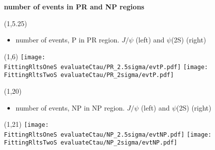 \documentclass[11pt,slidescentered,red,compress,handout,hyperref={bookmarks=true},mathseriftable]{beamer}
\newcommand{\FittingRltsOneS}{../Psi1S/Fit/parameter/}
\newcommand{\FittingRltsTwoS}{../Psi2S/Fit/parameter/}
\begin{document}
\section{}
\begin{frame}[t]{\small \bf number of events in PR and NP regions}{}
\begin{textblock}{48}(1,5.25)
\begin{itemize}
\scriptsize \item  number of events, P in PR region. $J/\psi$ (left) and $\psi$(2S) (right)
\end{itemize}
\end{textblock}
\begin{textblock}{48}(1,6)
\hspace*{10pt} \texttt{[image: \\FittingRltsOneS evaluateCtau/PR\_2.5sigma/evtP.pdf]}
\hspace*{10pt} \texttt{[image: \\FittingRltsTwoS evaluateCtau/PR\_2sigma/evtP.pdf]}
\end{textblock}

\begin{textblock}{48}(1,20)
\begin{itemize}
\scriptsize \item  number of events, NP in NP region. $J/\psi$ (left) and $\psi$(2S) (right)
\end{itemize}
\end{textblock}
\begin{textblock}{48}(1,21)
\hspace*{10pt} \texttt{[image: \\FittingRltsOneS evaluateCtau/NP\_2.5sigma/evtNP.pdf]}
\hspace*{10pt} \texttt{[image: \\FittingRltsTwoS evaluateCtau/NP\_2sigma/evtNP.pdf]}
\end{textblock}

\end{frame}
\end{document}
